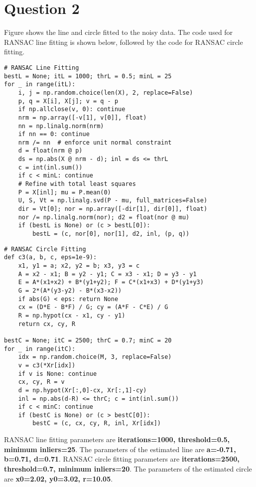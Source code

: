 \documentclass[11pt,a4paper]{article}
\begin{document}
\section*{Question 2}

Figure shows the line and circle fitted to the noisy data. The code used for RANSAC line fitting is shown below, followed by the code for RANSAC circle fitting.

\begin{lstlisting}
# RANSAC Line Fitting
bestL = None; itL = 1000; thrL = 0.5; minL = 25
for _ in range(itL):
    i, j = np.random.choice(len(X), 2, replace=False)
    p, q = X[i], X[j]; v = q - p
    if np.allclose(v, 0): continue
    nrm = np.array([-v[1], v[0]], float)
    nn = np.linalg.norm(nrm)
    if nn == 0: continue
    nrm /= nn  # enforce unit normal constraint
    d = float(nrm @ p)
    ds = np.abs(X @ nrm - d); inl = ds <= thrL
    c = int(inl.sum())
    if c < minL: continue
    # Refine with total least squares
    P = X[inl]; mu = P.mean(0)
    U, S, Vt = np.linalg.svd(P - mu, full_matrices=False)
    dir = Vt[0]; nor = np.array([-dir[1], dir[0]], float)
    nor /= np.linalg.norm(nor); d2 = float(nor @ mu)
    if (bestL is None) or (c > bestL[0]):
        bestL = (c, nor[0], nor[1], d2, inl, (p, q))
\end{lstlisting}

\begin{lstlisting}
# RANSAC Circle Fitting
def c3(a, b, c, eps=1e-9):
    x1, y1 = a; x2, y2 = b; x3, y3 = c
    A = x2 - x1; B = y2 - y1; C = x3 - x1; D = y3 - y1
    E = A*(x1+x2) + B*(y1+y2); F = C*(x1+x3) + D*(y1+y3)
    G = 2*(A*(y3-y2) - B*(x3-x2))
    if abs(G) < eps: return None
    cx = (D*E - B*F) / G; cy = (A*F - C*E) / G
    R = np.hypot(cx - x1, cy - y1)
    return cx, cy, R

bestC = None; itC = 2500; thrC = 0.7; minC = 20
for _ in range(itC):
    idx = np.random.choice(M, 3, replace=False)
    v = c3(*Xr[idx])
    if v is None: continue
    cx, cy, R = v
    d = np.hypot(Xr[:,0]-cx, Xr[:,1]-cy)
    inl = np.abs(d-R) <= thrC; c = int(inl.sum())
    if c < minC: continue
    if (bestC is None) or (c > bestC[0]):
        bestC = (c, cx, cy, R, inl, Xr[idx])
\end{lstlisting}

RANSAC line fitting parameters are \textbf{iterations=1000, threshold=0.5, minimum inliers=25}. The parameters of the estimated line are \textbf{a=-0.71, b=0.71, d=0.71}. RANSAC circle fitting parameters are \textbf{iterations=2500, threshold=0.7, minimum inliers=20}. The parameters of the estimated circle are \textbf{x0=2.02, y0=3.02, r=10.05}.
\end{document}
